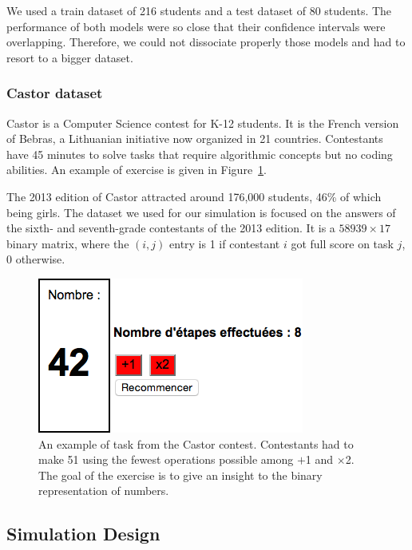 \documentclass{sig-alternate}
\begin{document}
We used a train dataset of 216 students and a test dataset of 80 students. The performance of both models were so close that their confidence intervals were overlapping. Therefore, we could not dissociate properly those models and had to resort to a bigger dataset.

\subsubsection{Castor dataset}

Castor is a Computer Science contest for K-12 students. It is the French version of Bebras, a Lithuanian initiative now organized in 21 countries. Contestants have 45 minutes to solve tasks that require algorithmic concepts but no coding abilities. An example of exercise is given in Figure~\ref{fig:51}.

The 2013 edition of Castor attracted around 176,000 students, 46\% of which being girls. The dataset we used for our simulation is focused on the answers of the sixth- and seventh-grade contestants of the 2013 edition. It is a $58939 \times 17$ binary matrix, where the $(i, j)$ entry is 1 if contestant $i$ got full score on task $j$, 0 otherwise.

\begin{figure}
\includegraphics[width=\linewidth]{51-calc}
\caption{An example of task from the Castor contest. Contestants had to make 51 using the fewest operations possible among $+$1 and $\times$2. The goal of the exercise is to give an insight to the binary representation of numbers.}
\label{fig:51}
\end{figure}

\subsection{Simulation Design}
\end{document}

